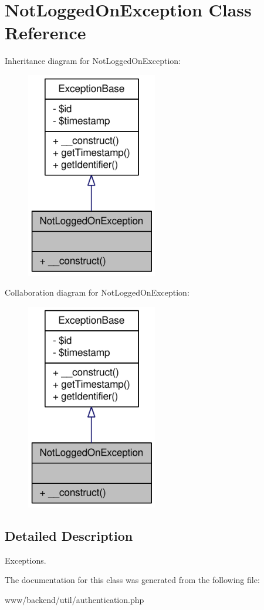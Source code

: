 \hypertarget{classNotLoggedOnException}{
\section{NotLoggedOnException Class Reference}
\label{classNotLoggedOnException}
}


Inheritance diagram for NotLoggedOnException:\nopagebreak
\begin{figure}[H]
\begin{center}
\leavevmode
\includegraphics[width=162pt]{classNotLoggedOnException__inherit__graph}
\end{center}
\end{figure}


Collaboration diagram for NotLoggedOnException:\nopagebreak
\begin{figure}[H]
\begin{center}
\leavevmode
\includegraphics[width=162pt]{classNotLoggedOnException__coll__graph}
\end{center}
\end{figure}


\subsection{Detailed Description}
Exceptions. 

The documentation for this class was generated from the following file:\begin{DoxyCompactItemize}
\item 
www/backend/util/authentication.php\end{DoxyCompactItemize}
